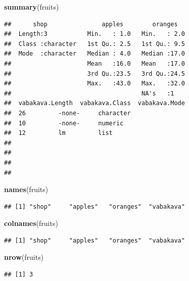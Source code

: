 \documentclass[]{book}
\newenvironment{Shaded}{\begin{snugshade}}{\end{snugshade}}
\newcommand{\KeywordTok}[1]{\textcolor[rgb]{0.13,0.29,0.53}{\textbf{#1}}}
\newcommand{\NormalTok}[1]{#1}
\begin{document}
\begin{Shaded}
\begin{Highlighting}[]
\KeywordTok{summary}\NormalTok{(fruits)}
\end{Highlighting}
\end{Shaded}

\begin{verbatim}
##      shop               apples        oranges    
##  Length:3           Min.   : 1.0   Min.   : 2.0  
##  Class :character   1st Qu.: 2.5   1st Qu.: 9.5  
##  Mode  :character   Median : 4.0   Median :17.0  
##                     Mean   :16.0   Mean   :17.0  
##                     3rd Qu.:23.5   3rd Qu.:24.5  
##                     Max.   :43.0   Max.   :32.0  
##                                    NA's   :1     
##  vabakava.Length  vabakava.Class  vabakava.Mode
##  26         -none-     character               
##  10         -none-     numeric                 
##  12         lm         list                    
##                                                
##                                                
##                                                
## 
\end{verbatim}

\begin{Shaded}
\begin{Highlighting}[]
\KeywordTok{names}\NormalTok{(fruits)}
\end{Highlighting}
\end{Shaded}

\begin{verbatim}
## [1] "shop"     "apples"   "oranges"  "vabakava"
\end{verbatim}

\begin{Shaded}
\begin{Highlighting}[]
\KeywordTok{colnames}\NormalTok{(fruits)}
\end{Highlighting}
\end{Shaded}

\begin{verbatim}
## [1] "shop"     "apples"   "oranges"  "vabakava"
\end{verbatim}

\begin{Shaded}
\begin{Highlighting}[]
\KeywordTok{nrow}\NormalTok{(fruits)}
\end{Highlighting}
\end{Shaded}

\begin{verbatim}
## [1] 3
\end{verbatim}
\end{document}
